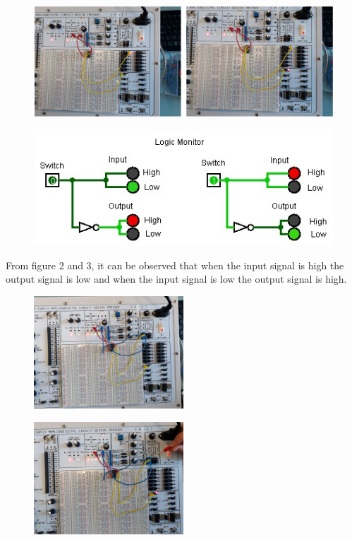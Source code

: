 \documentclass[pdftex,12pt,a4paper]{article}
\begin{document}
\begin{figure}[h]
	\centering
	\includegraphics[width=1\textwidth]{2.png}
	\caption
	\label{Figure 2}
\end{figure}

\begin{figure}[h]
	\centering
	\includegraphics[width=1\textwidth]{3.jpg}
	\caption
	\label{Figure 3}
\end{figure}
From figure 2 and 3, it can be observed that when the input signal is high the output signal is low and when the input signal is low the output signal is high.

\clearpage
\begin{figure}[h]
	\centering
	\includegraphics[width=0.5\textwidth, angle = 90 ]{4.jpg}
	\caption
	\label{Figure 4}
\end{figure}

\begin{figure}[h]
    \centering
	\includegraphics[width=0.5\textwidth, angle = 90 ]{5.jpg}
	\caption
	\label{Figure 5}
\end{figure}
\end{document}
